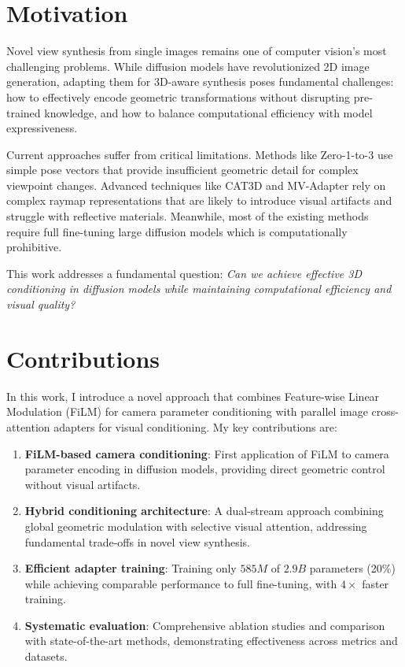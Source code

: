 \label{chapter:introduction}

\section{Motivation}

Novel view synthesis from single images remains one of computer vision's most challenging problems. While diffusion models have revolutionized 2D image generation, adapting them for 3D-aware synthesis poses fundamental challenges: how to effectively encode geometric transformations without disrupting pre-trained knowledge, and how to balance computational efficiency with model expressiveness.

Current approaches suffer from critical limitations. Methods like Zero-1-to-3 \cite{zero1to3} use simple pose vectors that provide insufficient geometric detail for complex viewpoint changes. Advanced techniques like CAT3D \cite{cat3d} and MV-Adapter \cite{mvadapter} rely on complex raymap representations that are likely to introduce visual artifacts and struggle with reflective materials. Meanwhile, most of the existing methods require full fine-tuning large diffusion models which is computationally prohibitive.

This work addresses a fundamental question: \textit{Can we achieve effective 3D conditioning in diffusion models while maintaining computational efficiency and visual quality?}

\section{Contributions}

In this work, I introduce a novel approach that combines Feature-wise Linear Modulation (FiLM) for camera parameter conditioning with parallel image cross-attention adapters for visual conditioning. My key contributions are:

\begin{enumerate}
  \item \textbf{FiLM-based camera conditioning}: First application of FiLM to camera parameter encoding in diffusion models, providing direct geometric control without visual artifacts.
  \item \textbf{Hybrid conditioning architecture}: A dual-stream approach combining global geometric modulation with selective visual attention, addressing fundamental trade-offs in novel view synthesis.
  \item \textbf{Efficient adapter training}: Training only $585M$ of $2.9B$ parameters (20\%) while achieving comparable performance to full fine-tuning, with $4\times$ faster training.
  \item \textbf{Systematic evaluation}: Comprehensive ablation studies and comparison with state-of-the-art methods, demonstrating effectiveness across metrics and datasets.
\end{enumerate}

